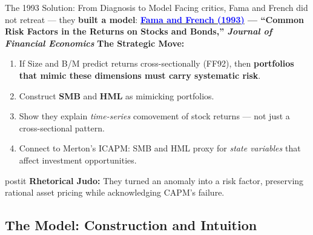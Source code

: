 \documentclass{beamer}
\begin{document}
\begin{frame}{The 1993 Solution: From Diagnosis to Model}
	Facing critics, Fama and French did not retreat --- they \textbf{built a model}:
	\vspace{4pt}
	\textbf{\href{https://www.sciencedirect.com/science/article/pii/0304405X93900235}{\textcolor{blue}{Fama and French (1993)}} --- ``Common Risk Factors in the Returns on Stocks and Bonds,'' \textit{Journal of Financial Economics}}
	\vspace{6pt}
	\textbf{The Strategic Move:}
	\begin{enumerate}
		\item If Size and B/M predict returns cross-sectionally (FF92), then \textbf{portfolios that mimic these dimensions must carry systematic risk}.
		\item Construct \textbf{SMB} and \textbf{HML} as mimicking portfolios.
		\item Show they explain \textit{time-series} comovement of stock returns --- not just a cross-sectional pattern.
		\item Connect to Merton's ICAPM: SMB and HML proxy for \textit{state variables} that affect investment opportunities.
	\end{enumerate}
	\vspace{4pt}
	\begin{beamercolorbox}[sep=0.3em,wd=\linewidth,rounded=true,shadow=true]{postit}
		\small \textbf{Rhetorical Judo:} They turned an anomaly into a risk factor, preserving rational asset pricing while acknowledging CAPM's failure.
	\end{beamercolorbox}
\end{frame}

\subsection{The Model: Construction and Intuition}
\end{document}
